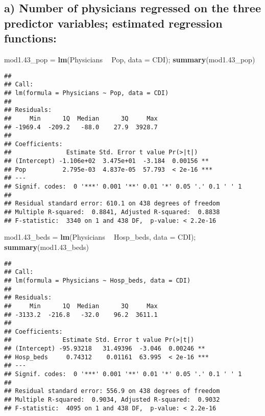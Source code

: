 \documentclass[]{article}
\newenvironment{Shaded}{\begin{snugshade}}{\end{snugshade}}
\newcommand{\DataTypeTok}[1]{\textcolor[rgb]{0.13,0.29,0.53}{#1}}
\newcommand{\FloatTok}[1]{\textcolor[rgb]{0.00,0.00,0.81}{#1}}
\newcommand{\KeywordTok}[1]{\textcolor[rgb]{0.13,0.29,0.53}{\textbf{#1}}}
\newcommand{\NormalTok}[1]{#1}
\newcommand{\OperatorTok}[1]{\textcolor[rgb]{0.81,0.36,0.00}{\textbf{#1}}}
\newcommand{\StringTok}[1]{\textcolor[rgb]{0.31,0.60,0.02}{#1}}
\begin{document}
\hypertarget{a-number-of-physicians-regressed-on-the-three-predictor-variables-estimated-regression-functions}{%
\subsection{a) Number of physicians regressed on the three predictor
variables; estimated regression
functions:}\label{a-number-of-physicians-regressed-on-the-three-predictor-variables-estimated-regression-functions}}

\begin{Shaded}
\begin{Highlighting}[]
\NormalTok{mod1}\FloatTok{.43}\NormalTok{_pop =}\StringTok{ }\KeywordTok{lm}\NormalTok{(Physicians }\OperatorTok{~}\StringTok{ }\NormalTok{Pop, }\DataTypeTok{data =}\NormalTok{ CDI); }\KeywordTok{summary}\NormalTok{(mod1}\FloatTok{.43}\NormalTok{_pop)}
\end{Highlighting}
\end{Shaded}

\begin{verbatim}
## 
## Call:
## lm(formula = Physicians ~ Pop, data = CDI)
## 
## Residuals:
##     Min      1Q  Median      3Q     Max 
## -1969.4  -209.2   -88.0    27.9  3928.7 
## 
## Coefficients:
##               Estimate Std. Error t value Pr(>|t|)    
## (Intercept) -1.106e+02  3.475e+01  -3.184  0.00156 ** 
## Pop          2.795e-03  4.837e-05  57.793  < 2e-16 ***
## ---
## Signif. codes:  0 '***' 0.001 '**' 0.01 '*' 0.05 '.' 0.1 ' ' 1
## 
## Residual standard error: 610.1 on 438 degrees of freedom
## Multiple R-squared:  0.8841, Adjusted R-squared:  0.8838 
## F-statistic:  3340 on 1 and 438 DF,  p-value: < 2.2e-16
\end{verbatim}

\begin{Shaded}
\begin{Highlighting}[]
\NormalTok{mod1}\FloatTok{.43}\NormalTok{_beds =}\StringTok{ }\KeywordTok{lm}\NormalTok{(Physicians }\OperatorTok{~}\StringTok{ }\NormalTok{Hosp_beds, }\DataTypeTok{data =}\NormalTok{ CDI); }\KeywordTok{summary}\NormalTok{(mod1}\FloatTok{.43}\NormalTok{_beds)}
\end{Highlighting}
\end{Shaded}

\begin{verbatim}
## 
## Call:
## lm(formula = Physicians ~ Hosp_beds, data = CDI)
## 
## Residuals:
##     Min      1Q  Median      3Q     Max 
## -3133.2  -216.8   -32.0    96.2  3611.1 
## 
## Coefficients:
##              Estimate Std. Error t value Pr(>|t|)    
## (Intercept) -95.93218   31.49396  -3.046  0.00246 ** 
## Hosp_beds     0.74312    0.01161  63.995  < 2e-16 ***
## ---
## Signif. codes:  0 '***' 0.001 '**' 0.01 '*' 0.05 '.' 0.1 ' ' 1
## 
## Residual standard error: 556.9 on 438 degrees of freedom
## Multiple R-squared:  0.9034, Adjusted R-squared:  0.9032 
## F-statistic:  4095 on 1 and 438 DF,  p-value: < 2.2e-16
\end{verbatim}
\end{document}
